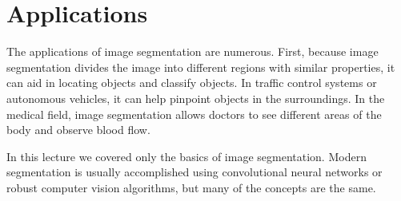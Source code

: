 \documentclass{article}
\begin{document}
\section{Applications}
The applications of image segmentation are numerous. First, because image segmentation divides the image into different regions with similar properties, it can aid in locating objects and classify objects. In traffic control systems or autonomous vehicles, it can help pinpoint objects in the surroundings. In the medical field, image segmentation allows doctors to see different areas of the body and observe blood flow.

In this lecture we covered only the basics of image segmentation. Modern segmentation is usually accomplished using convolutional neural networks or robust computer vision algorithms, but many of the concepts are the same.
\end{document}
